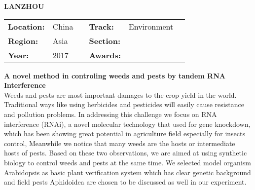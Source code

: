 \textbf{\uppercase{Lanzhou}}
\FloatBarrier
\begin{table}[h]
\begin{tabular}{lp{2.5cm}llll}
\textbf{Location:} & China & \multicolumn{1}{|l}{} & \textbf{Track:}   & Environment \\
\textbf{Region:}   & Asia   & \multicolumn{1}{|l}{} & \textbf{Section:} &  \\
\textbf{Year:}     & 2017   & \multicolumn{1}{|l}{} & \textbf{Awards:}  &
\end{tabular}
\end{table}
\FloatBarrier
\noindent	\textbf{A novel method in controling weeds and pests by tandem RNA Interference} \vspace{.2cm}\\
Weeds and pests are most important damages to the crop yield in the world. Traditional ways like using herbicides and pesticides will easily cause resistance and pollution problems. In addressing this challenge we focus on RNA interference (RNAi), a novel molecular technology that used for gene knockdown, which has been showing great potential in agriculture field especially for insects control, Meanwhile we notice that many weeds are the hosts or intermediate hosts of pests. Based on these two observations, we are aimed at using synthetic biology to control weeds and pests at the same time. We selected model organism Arabidopsis as basic plant verification system which has clear genetic background and field pests Aphidoidea are chosen to be discussed as well in our experiment.
\vspace{2cm} $ $
\pagebreak

